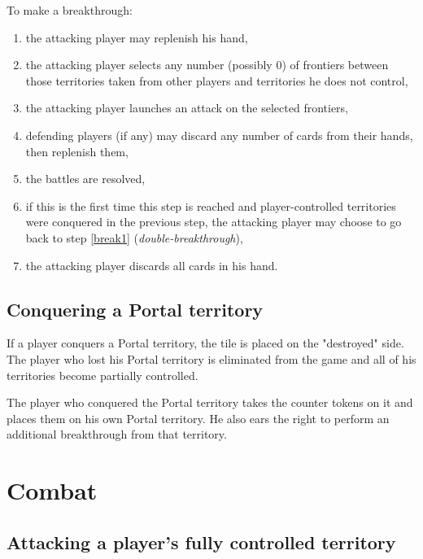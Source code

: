 \documentclass[a4paper]{article}
\begin{document}
    \hspace{-2em} To make a breakthrough:
    \vspace{-1.3em}
    \begin{enumerate}
        \item the attacking player may replenish his hand, \label{break1}
        \item the attacking player selects any number (possibly 0) of frontiers between
        those territories taken from other players and territories he does not control,
        \item the attacking player launches an attack on the selected frontiers,
        \item defending players (if any) may discard any number of cards from their hands,
        then replenish them,
        \item the battles are resolved,
        \item if this is the first time this step is reached and player-controlled
        territories were conquered in the previous step, the attacking player may choose
        to go back to step \ref{break1} (\textit{double-breakthrough}),
        \item the attacking player discards all cards in his hand.
    \end{enumerate}


\subsection{Conquering a Portal territory}

    If a player conquers a Portal territory, the tile is placed on the "destroyed" side.
    The player who lost his Portal territory is eliminated from the game
    and all of his territories become partially controlled.
    
    The player who conquered the Portal territory takes the counter tokens
    on it and places them on his own Portal territory.
    He also ears the right to perform an additional breakthrough from that territory.


\newpage
\section{Combat}

  \subsection{Attacking a player's fully controlled territory}
  
\end{document}
